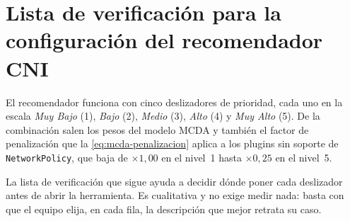 \section{Lista de verificación para la configuración del recomendador CNI} \label{sec:apb_checklist}

El recomendador funciona con cinco deslizadores de prioridad, cada uno en la escala \emph{Muy Bajo} (1), \emph{Bajo} (2), \emph{Medio} (3), \emph{Alto} (4) y \emph{Muy Alto} (5). De la combinación salen los pesos del modelo MCDA y también el factor de penalización que la \cref{eq:mcda-penalizacion} aplica a los plugins sin soporte de \texttt{NetworkPolicy}, que baja de $\times 1{,}00$ en el nivel~1 hasta $\times 0{,}25$ en el nivel~5.

La lista de verificación que sigue ayuda a decidir dónde poner cada deslizador antes de abrir la herramienta. Es cualitativa y no exige medir nada: basta con que el equipo elija, en cada fila, la descripción que mejor retrata su caso.

